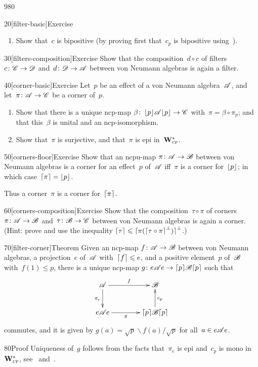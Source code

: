 \begin{parsec}{980}
\begin{point}{20}[filter-basic]{Exercise}
\begin{enumerate}
Conclude that~$c$
is faithful (so $\ceil{f}=1$), and that~$c$ is mono in~$\W{CP}$.
\item
Show that~$c$ is bipositive
(by proving first that~$c_p$
is bipositive using~).
\end{enumerate}
\spacingfix%
\end{point}%
\begin{point}{30}[filters-composition]{Exercise}%
Show that the composition~$d\circ c$
of filters~$c\colon\mathscr{C}\to\mathscr{D}$
and~$d\colon \mathscr{D}\to\mathscr{A}$ 
between von Neumann algebras
is again a filter.
\end{point}
\begin{point}{40}[corner-basic]{Exercise}%
Let~$p$ be an effect of a von Neumann algebra~$\mathscr{A}$,
and let~$\pi\colon \mathscr{A}\to\mathscr{C}$ be a corner of~$p$.
\begin{enumerate}
\item
Show that there is a unique ncp-map
$\beta \colon \left\lfloor p\right\rfloor\!\mathscr{A}\!\left\lfloor p\right\rfloor\to\mathscr{C}$
with~$\pi = \beta\circ \pi_p$;
and that this~$\beta$ is unital and an ncp-isomorphism.
\item
Show that~$\pi$ is surjective, and that~$\pi$ is epi in~$\mathbf{W}^*_{\text{\textsc{cp}}}$.
\end{enumerate}
\spacingfix%
\end{point}%
\begin{point}{50}[corners-floor]{Exercise}%
Show that an ncpu-map $\pi\colon \mathscr{A}\to\mathscr{B}$
between von Neumann algebras
is a corner for an effect~$p$ of~$\mathscr{A}$
iff~$\pi$ is a corner for~$\left\lfloor p\right\rfloor$;
in which case~$\left\lceil\pi\right\rceil=\left\lfloor p\right\rfloor$.

Thus a corner~$\pi$ is a corner for~$\left\lceil\pi\right\rceil$.
\end{point}
\begin{point}{60}[corners-composition]{Exercise}%
Show that the composition~$\tau\circ \pi$
of corners~$\pi\colon \mathscr{A}\to\mathscr{B}$
and~$\tau\colon \mathscr{B}\to\mathscr{C}$
between von Neumann algebras
is again a corner.\\
(Hint:
prove
and use the inequality
$\left\lceil\tau\right\rceil\leqslant \left\lceil\smash{\pi(\left\lceil\tau\circ \pi\right\rceil^\perp)}\right\rceil^\perp$.)
\end{point}
\begin{point}{70}[filter-corner]{Theorem}%
Given an ncp-map $f\colon\mathscr{A}\to\mathscr{B}$
between von Neumann algebras,
a projection~$e$ of~$\mathscr{A}$
with~$\left\lceil f\right\rceil\leqslant e$,
and a positive element~$p$
of~$\mathscr{B}$ with~$f(1) \leq p$,
there is a unique ncp-map
$g \colon e\mathscr{A} e
\to \left\lceil p\right\rceil\!\mathscr{B}\!\left\lceil p\right\rceil$
such that
\begin{equation*}
\xymatrix@C=4em{
\scrA
\ar[r]^-f
\ar[d]_{\pi_e}
&
\scrB
\\
e\scrA e
\ar[r]_-g
& 
\ceil{p}\!\scrB\!\ceil{p}
\ar[u]_{c_p}
}
\end{equation*}
commutes,
and it is given by
$g(a)=\sqrt{p}\backslash f(a)/\!\sqrt{p}$
for all~$a\in e\mathscr{A} e$.
\begin{point}{80}{Proof}%
Uniqueness of~$g$ follows from the facts
that~$\pi_e$ is epi and~$c_p$ is mono
in~$\mathbf{W}^*_{\text{\textsc{cp}}}$,
see~ and~.


\end{point}
\end{point}
\end{parsec}
